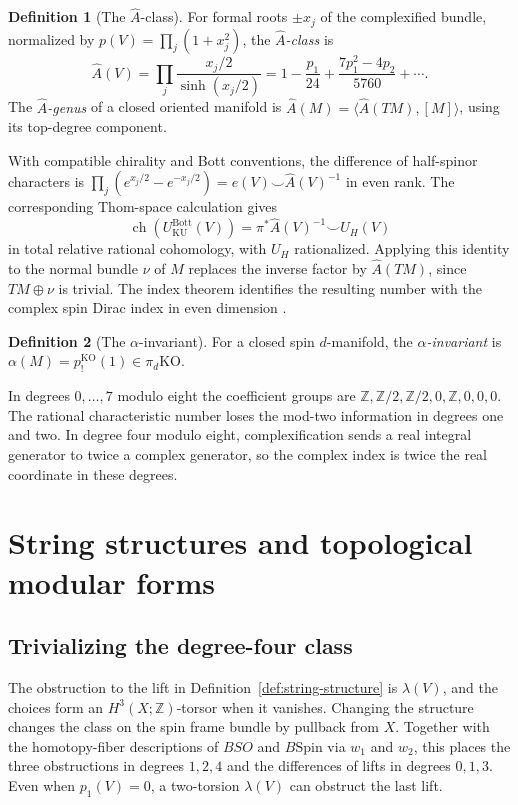 \documentclass[11pt]{article}
\theoremstyle{definition}
\newtheorem{defn}{Definition}[section]
\newcommand{\KO}{\mathrm{KO}}
\newcommand{\KU}{\mathrm{KU}}
\newcommand{\ch}{\operatorname{ch}}
\newcommand{\Z}{\mathbb Z}
\newcommand{\Ahat}{\widehat A}
\newcommand{\Spin}{\mathrm{Spin}}
\begin{document}
\begin{defn}[The \(\Ahat{}\)-class]
For formal roots \(\pm x_j\) of the complexified bundle, normalized by \(p(V)=\prod_j(1+x_j^2)\), the \emph{\(\Ahat{}\)-class} is
\[
 \Ahat(V)=\prod_j\frac{x_j/2}{\sinh(x_j/2)}
 =1-\frac{p_1}{24}+\frac{7p_1^2-4p_2}{5760}+\cdots .
\]
The \emph{\(\Ahat{}\)-genus} of a closed oriented manifold is \(\Ahat(M)=\langle \Ahat(TM),[M]\rangle\), using its top-degree component.
\end{defn}

With compatible chirality and Bott conventions, the difference of half-spinor characters is \(\prod_j(e^{x_j/2}-e^{-x_j/2})=e(V)\smile\Ahat(V)^{-1}\) in even rank. The corresponding Thom-space calculation gives
\[
 \ch(U_{\KU}^{\mathrm{Bott}}(V))=\pi^*\Ahat(V)^{-1}\smile U_H(V)
\]
in total relative rational cohomology, with \(U_H\) rationalized. Applying this identity to the normal bundle \(\nu\) of \(M\) replaces the inverse factor by \(\Ahat(TM)\), since \(TM\oplus\nu\) is trivial. The index theorem identifies the resulting number with the complex spin Dirac index in even dimension \cite{ABS,Wl}.

\begin{defn}[The \(\alpha\)-invariant]
For a closed spin \(d\)-manifold, the \emph{\(\alpha\)-invariant} is \(\alpha(M)=p_!^{\KO}(1)\in\pi_d\KO\).
\end{defn}
In degrees \(0,\ldots,7\) modulo eight the coefficient groups are \(\Z,\Z/2,\Z/2,0,\Z,0,0,0\). The rational characteristic number loses the mod-two information in degrees one and two. In degree four modulo eight, complexification sends a real integral generator to twice a complex generator, so the complex index is twice the real coordinate in these degrees.

\section{String structures and topological modular forms}
\subsection{Trivializing the degree-four class}
The obstruction to the lift in Definition~\ref{def:string-structure} is \(\lambda(V)\), and the choices form an \(H^3(X;\Z)\)-torsor when it vanishes. Changing the structure changes the class on the spin frame bundle by pullback from \(X\). Together with the homotopy-fiber descriptions of \(BSO\) and \(B\Spin\) via \(w_1\) and \(w_2\), this places the three obstructions in degrees \(1,2,4\) and the differences of lifts in degrees \(0,1,3\). Even when \(p_1(V)=0\), a two-torsion \(\lambda(V)\) can obstruct the last lift.
\end{document}
